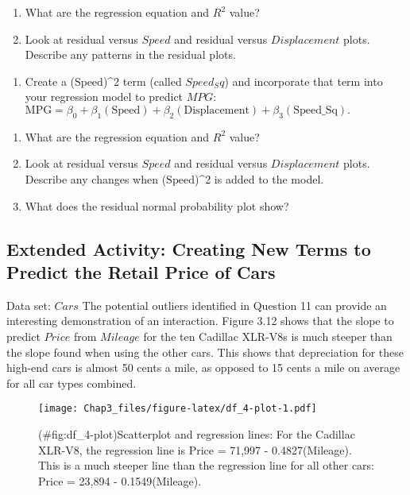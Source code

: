 \documentclass[
]{report}
\providecommand{\tightlist}{%
  \setlength{\itemsep}{0pt}\setlength{\parskip}{0pt}}
\theoremstyle{definition}
\theoremstyle{definition}
\theoremstyle{definition}
\theoremstyle{definition}
\theoremstyle{remark}
\begin{document}
\begin{enumerate}
\def\labelenumi{\alph{enumi}.}
\tightlist
\item
  What are the regression equation and \(R^2\) value?
\item
  Look at residual versus \(Speed\) and residual versus \(Displacement\) plots. Describe any patterns in the residual plots.
\end{enumerate}

\begin{enumerate}
\def\labelenumi{\arabic{enumi}.}
\setcounter{enumi}{39}
\tightlist
\item
  Create a (\(\mathrm{Speed}\))\^{}2 term (called \(Speed_Sq\)) and incorporate that term into your regression model to predict \(MPG\): \(\mathrm{MPG} = \beta_0 + \beta_1(\mathrm{Speed}) + \beta_2(\mathrm{Displacement}) + \beta_3(\mathrm{Speed\_Sq}).\)
\end{enumerate}

\begin{enumerate}
\def\labelenumi{\alph{enumi}.}
\tightlist
\item
  What are the regression equation and \(R^2\) value?
\item
  Look at residual versus \(Speed\) and residual versus \(Displacement\) plots. Describe any changes when (\(\mathrm{Speed}\))\^{}2 is added to the model.
\item
  What does the residual normal probability plot show?
\end{enumerate}

\hypertarget{extended-activity-creating-new-terms-to-predict-the-retail-price-of-cars}{%
\subsection{Extended Activity: Creating New Terms to Predict the Retail Price of Cars}\label{extended-activity-creating-new-terms-to-predict-the-retail-price-of-cars}}

Data set: \(Cars\)
The potential outliers identified in Question 11 can provide an interesting demonstration of an interaction. Figure 3.12 shows that the slope to predict \(Price\) from \(Mileage\) for the ten Cadillac XLR-V8s is much steeper than the slope found when using the other cars. This shows that depreciation for these high-end cars is almost 50 cents a mile, as opposed to 15 cents a mile on average for all car types combined.

\begin{figure}
\centering
\texttt{[image: Chap3\_files/figure-latex/df\_4-plot-1.pdf]}
\caption{(\#fig:df\_4-plot)Scatterplot and regression lines: For the Cadillac XLR-V8, the regression line is Price = 71,997 - 0.4827(Mileage). This is a much steeper line than the regression line for all other cars: Price = 23,894 - 0.1549(Mileage).}
\end{figure}
\end{document}
